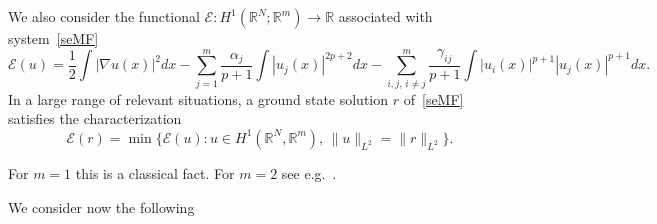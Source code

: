 \documentclass[11pt]{amsart}
\numberwithin{equation}{section}
\theoremstyle{definition}
\begin{document}
\noindent
We also consider the functional ${\mathcal E}:H^1({{\mathbb R}}^N;{{\mathbb R}}^m)\to{{\mathbb R}}$ associated with system~\eqref{seMF}
\begin{equation*}
{\mathcal E}(u) =\frac{1}{2}\int |\nabla u(x)|^2dx
-\sum_{j=1}^m\frac{\alpha_j}{p+1}\int |u_j(x)|^{2p+2}dx
 -\sum_{i,j,\,i\neq j}^m \frac{\gamma_{ij}}{p+1}\int |u_i(x)|^{p+1}|u_j(x)|^{p+1}dx.
\end{equation*}
In a large range of relevant situations, a ground state
solution $r$ of~\eqref{seMF} satisfies the characterization
\begin{equation}
\label{variatcaract-r} {\mathcal E}(r)=\min\{{\mathcal E}(u): u\in
H^1({{\mathbb R}}^N,{{\mathbb R}}^m),\,\|u\|_{L^2}=\|r\|_{L^2}\}.
\end{equation}

\noindent
For $m=1$ this is a classical fact. For $m=2$ see e.g.~\cite{mmp2}.

\noindent We consider now the following
\end{document}
